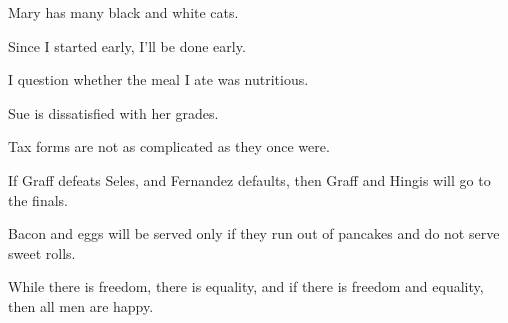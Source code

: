 \begin{enumerate}
	\begin{statement}{Mary has many black and white cats.}
	\end{statement}

	\begin{statement}{Since I started early, I’ll be done early.}
	\end{statement}

	\begin{statement}{I question whether the meal I ate was nutritious.}
	\end{statement}

	\begin{statement}{Sue is dissatisfied with her grades.}
	\end{statement}

	\begin{statement}{Tax forms are not as complicated as they once were.}
	\end{statement}

	\begin{statement}{If Graff defeats Seles, and Fernandez defaults, then Graff and Hingis will go to the finals.}
	\end{statement}

	\begin{statement}{Bacon and eggs will be served only if they run out of pancakes and do not serve sweet rolls.}
	\end{statement}

	\begin{statement}{While there is freedom, there is equality, and if there is freedom and equality, then all men are happy.}
	\end{statement}


\end{enumerate}
